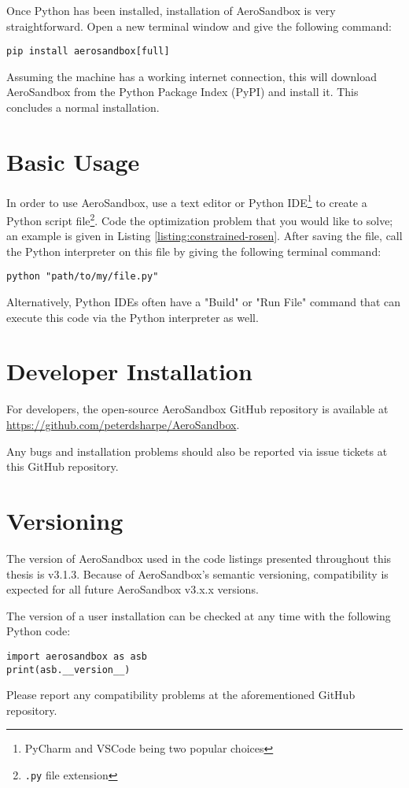 Once Python has been installed, installation of AeroSandbox is very straightforward. Open a new terminal window and give the following command:
\begin{verbatim}
pip install aerosandbox[full]
\end{verbatim}

Assuming the machine has a working internet connection, this will download AeroSandbox from the Python Package Index (PyPI) and install it. This concludes a normal installation.


\section{Basic Usage}

In order to use AeroSandbox, use a text editor or Python IDE\footnote{PyCharm and VSCode being two popular choices} to create a Python script file\footnote{\texttt{.py} file extension}. Code the optimization problem that you would like to solve; an example is given in Listing \ref{listing:constrained-rosen}. After saving the file, call the Python interpreter on this file by giving the following terminal command:
\begin{verbatim}
python "path/to/my/file.py"
\end{verbatim}

Alternatively, Python IDEs often have a "Build" or "Run File" command that can execute this code via the Python interpreter as well.


\section{Developer Installation}

For developers, the open-source AeroSandbox GitHub repository is available at \url{https://github.com/peterdsharpe/AeroSandbox}.

Any bugs and installation problems should also be reported via issue tickets at this GitHub repository.


\section{Versioning}

The version of AeroSandbox used in the code listings presented throughout this thesis is v3.1.3. Because of AeroSandbox's semantic versioning, compatibility is expected for all future AeroSandbox v3.x.x versions.

The version of a user installation can be checked at any time with the following Python code:

\begin{verbatim}
import aerosandbox as asb
print(asb.__version__)
\end{verbatim}

Please report any compatibility problems at the aforementioned GitHub repository.